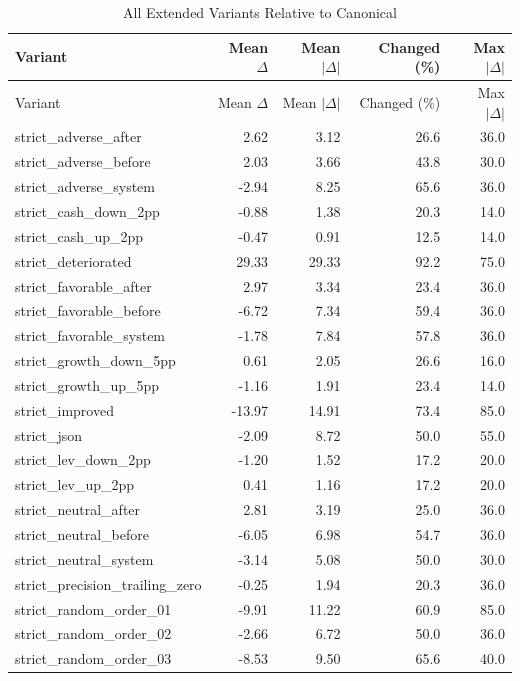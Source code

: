 {\small
\begin{longtable}{@{}p{}rrrr@{}}
\caption{All Extended Variants Relative to Canonical}\label{tab:a_extended}\\
\toprule Variant & Mean $\Delta$ & Mean $|\Delta|$ & Changed (\%) & Max $|\Delta|$ \\
\midrule\endfirsthead
\toprule Variant & Mean $\Delta$ & Mean $|\Delta|$ & Changed (\%) & Max $|\Delta|$ \\
\midrule\endhead
strict\_adverse\_after & 2.62 & 3.12 & 26.6 & 36.0 \\
strict\_adverse\_before & 2.03 & 3.66 & 43.8 & 30.0 \\
strict\_adverse\_system & -2.94 & 8.25 & 65.6 & 36.0 \\
strict\_cash\_down\_2pp & -0.88 & 1.38 & 20.3 & 14.0 \\
strict\_cash\_up\_2pp & -0.47 & 0.91 & 12.5 & 14.0 \\
strict\_deteriorated & 29.33 & 29.33 & 92.2 & 75.0 \\
strict\_favorable\_after & 2.97 & 3.34 & 23.4 & 36.0 \\
strict\_favorable\_before & -6.72 & 7.34 & 59.4 & 36.0 \\
strict\_favorable\_system & -1.78 & 7.84 & 57.8 & 36.0 \\
strict\_growth\_down\_5pp & 0.61 & 2.05 & 26.6 & 16.0 \\
strict\_growth\_up\_5pp & -1.16 & 1.91 & 23.4 & 14.0 \\
strict\_improved & -13.97 & 14.91 & 73.4 & 85.0 \\
strict\_json & -2.09 & 8.72 & 50.0 & 55.0 \\
strict\_lev\_down\_2pp & -1.20 & 1.52 & 17.2 & 20.0 \\
strict\_lev\_up\_2pp & 0.41 & 1.16 & 17.2 & 20.0 \\
strict\_neutral\_after & 2.81 & 3.19 & 25.0 & 36.0 \\
strict\_neutral\_before & -6.05 & 6.98 & 54.7 & 36.0 \\
strict\_neutral\_system & -3.14 & 5.08 & 50.0 & 30.0 \\
strict\_precision\_trailing\_zero & -0.25 & 1.94 & 20.3 & 36.0 \\
strict\_random\_order\_01 & -9.91 & 11.22 & 60.9 & 85.0 \\
strict\_random\_order\_02 & -2.66 & 6.72 & 50.0 & 36.0 \\
strict\_random\_order\_03 & -8.53 & 9.50 & 65.6 & 40.0 \\

\end{longtable}}
